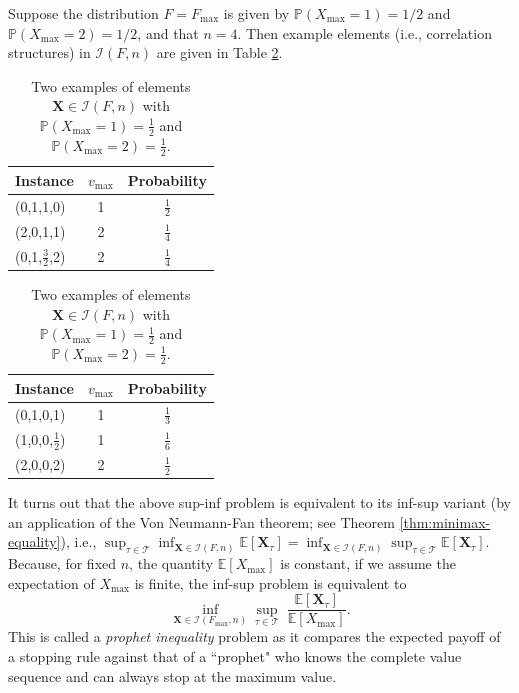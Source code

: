 \documentclass[11pt,a4paper]{article}
\numberwithin{equation}{section}
\newcommand{\Prob}{\mathbb{P}}
\begin{document}
\begin{example}
Suppose the distribution $F = F_{\max}$ is given by $\Prob(X_{\max} = 1) = 1/2$ and $\Prob(X_{\max} = 2) = 1/2$, and that $n = 4$. Then example elements (i.e., correlation structures) in $\mathcal{I}(F, n)$ are given in Table \ref{tab:instances}.
\begin{table}[h!]
    \centering
    \begin{minipage}[t]{0.48\textwidth}
    \centering
    \begin{tabular}{lcc}
        \toprule
        \textbf{Instance} & \( v_{\max} \) & \textbf{Probability} \\
        \midrule
        (0,1,1,0) & 1 & \( \frac{1}{2} \) \\[1ex]
        (2,0,1,1) & 2 & \( \frac{1}{4} \) \\[1ex]
        (0,1,\( \frac{3}{2} \),2) & 2 & \( \frac{1}{4} \) \\
        \bottomrule
    \end{tabular}
    \end{minipage}
    \hfill
    \begin{minipage}[t]{0.48\textwidth}
    \centering
    \begin{tabular}{lcc}
        \toprule
        \textbf{Instance} & \( v_{\max} \) & \textbf{Probability} \\
        \midrule
        (0,1,0,1) & 1 & \( \frac{1}{3} \) \\[1ex]
        (1,0,0,$\frac{1}{2}$) & 1 & \( \frac{1}{6} \) \\[1ex]
        (2,0,0,2) & 2 & \( \frac{1}{2} \) \\
        \bottomrule
    \end{tabular}
    \end{minipage}
    \caption{Two examples of elements $\mathbf{X} \in \mathcal{I}(F,n)$ with $\Prob(X_{\max} = 1) = \frac{1}{2}$ and $\Prob(X_{\max} = 2) = \frac{1}{2}$.}
    \label{tab:instances}
\end{table}



\end{example}
It turns out that the above sup-inf problem is equivalent to its inf-sup variant (by an application of the Von Neumann-Fan theorem; see Theorem \ref{thm:minimax-equality}), i.e., 
$
\sup_{\tau\in\mathcal{T}}\inf_{\boldsymbol{X}\in\mathcal{I}(F, n)}\mathbb{E}[\boldsymbol{X}_{\tau}]=\inf_{\boldsymbol{X}\in\mathcal{I}(F, n)}\sup_{\tau\in\mathcal{T}}\mathbb{E}[\boldsymbol{X}_{\tau}].
$
Because, for fixed $n$, the quantity $\mathbb{E}[X_{\max}]$ is constant, if we assume the expectation of $X_{\max}$ is finite, the inf-sup problem is equivalent to
$$
\inf_{\boldsymbol{X}\in\mathcal{I}(F_{\max}, n)}\sup_{\tau\in\mathcal{T}} \; \frac{\mathbb{E}[\boldsymbol{X}_{\tau}]}{\mathbb{E}[X_{\max}]}.
$$
This is called a \textit{prophet inequality} problem as it compares the expected payoff of a stopping rule against that of a ``prophet" who knows the complete value sequence and can always stop at the maximum value.
\end{document}
